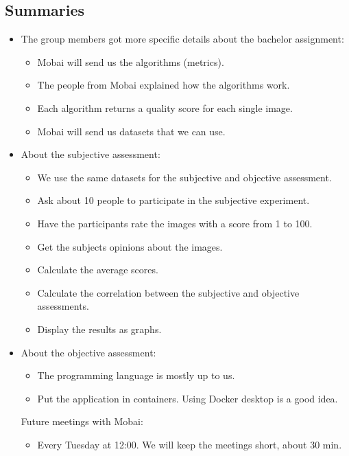 \subsection*{Summaries}
\begin{itemize}
    \item The group members got more specific details about the bachelor assignment:
    \begin{itemize}
        \item Mobai will send us the algorithms (metrics).
        \item The people from Mobai explained how the algorithms work.
        \item Each algorithm returns a quality score for each single image.
        \item Mobai will send us datasets that we can use.
    \end{itemize}
    \item About the subjective assessment:
    \begin{itemize}
        \item We use the same datasets for the subjective and objective assessment.
        \item Ask about 10 people to participate in the subjective experiment.
        \item Have the participants rate the images with a score from 1 to 100.
        \item Get the subjects opinions about the images.
        \item Calculate the average scores.
        \item Calculate the correlation between the subjective and objective assessments.
        \item Display the results as graphs.
    \end{itemize}
    \item About the objective assessment:
    \begin{itemize}
        \item The programming language is mostly up to us.
        \item Put the application in containers. Using Docker desktop is a good idea.
    \end{itemize}
    Future meetings with Mobai: 
    \begin{itemize}
        \item Every Tuesday at 12:00. We will keep the meetings short, about  30 min.
    \end{itemize}
\end{itemize}
